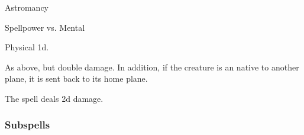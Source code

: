 \newpage
\begin{spellsection}{Astromancy}

\begin{spellheader}
\end{spellheader}

\begin{spellcontent}

\begin{spelltargetinginfo}




\end{spelltargetinginfo}


\begin{spelleffects}




\begin{spellattack}{Spellpower vs. Mental}


\hit Physical  \plus1d.


\crit
As above, but double damage.
In addition, if the creature is an  native to another plane, it is sent back to its home plane.



\end{spellattack}





\end{spelleffects}

\end{spellcontent}
\begin{spellfooter}


\end{spellfooter}
\begin{spellsubcontent}


\begin{spellcantrip}
The spell deals \minus2d damage.
\end{spellcantrip}


\end{spellsubcontent}
\end{spellsection}


\subsubsection{Subspells}


